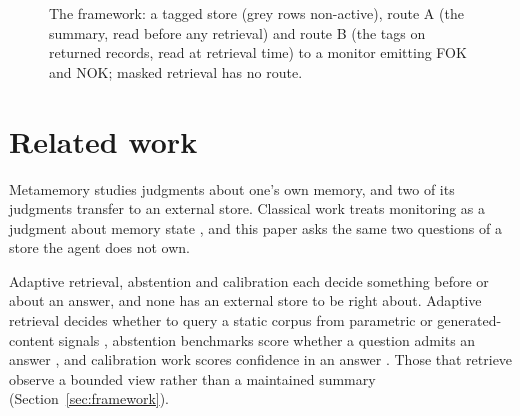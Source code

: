 \documentclass{article}
\begin{document}
\begin{figure}[t]
\caption{The framework: a tagged store (grey rows non-active), route A (the summary, read before any retrieval) and route B (the tags on returned records, read at retrieval time) to a monitor emitting FOK and NOK; masked retrieval has no route.}
\label{fig:framework}
\end{figure}

\section{Related work}\label{sec:related}

Metamemory studies judgments about one's own memory, and two of its judgments transfer to an external store.
Classical work treats monitoring as a judgment about memory state \citep{nelson1990,koriat1996}, and this paper asks the same two questions of a store the agent does not own.

Adaptive retrieval, abstention and calibration each decide something before or about an answer, and none has an external store to be right about.
Adaptive retrieval decides whether to query a static corpus from parametric or generated-content signals \citep{lewis2020,flare,mallen2023,ren2025,wang2023,selfrag,su2024,seakr,verbrouting,metamem}, abstention benchmarks score whether a question admits an answer \citep{rajpurkar2018,kamath2020,yang2024,abstentionbench}, and calibration work scores confidence in an answer \citep{kadavath2022,lin2022,tian2023,xiong2024}.
Those that retrieve observe a bounded view rather than a maintained summary (Section~\ref{sec:framework}).
\end{document}
